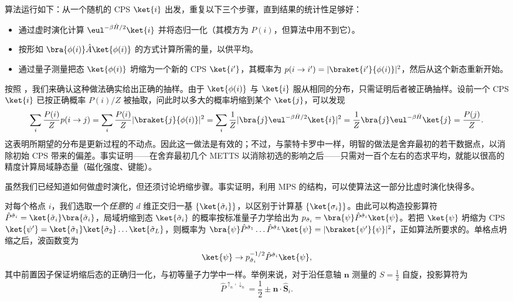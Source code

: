 算法运行如下：从一个随机的 CPS $\ket{i}$ 出发，重复以下三个步骤，直到结果的统计性足够好：
\begin{itemize}  
\item 通过虚时演化计算 $\eul^{-\beta\hat{H}/2} \ket{i}$ 并将态归一化（其模方为 $P(i)$，但算法中用不到它）。
\item 按形如 $\bra{\phi(i)} \hat{A} \ket{\phi(i)}$ 的方式计算所需的量，以供平均。
\item 通过量子测量把态 $\ket{\phi(i)}$ 坍缩为一个新的 CPS $\ket{i'}$，其概率为 $p(i\rightarrow i') = |\braket{i'}{\phi(i)}|^2$，然后从这个新态重新开始。
\end{itemize}

按照 \cite{Stoudenmire10}，我们来确认这种做法确实给出正确的抽样。由于 $\ket{\phi(i)}$ 与 $\ket{i}$ 服从相同的分布，只需证明后者被正确抽样。设前一个 CPS $\ket{i}$ 已按正确概率 $P(i)/Z$ 被抽取，问此时以多大的概率坍缩到某个 $\ket{j}$，可以发现
\begin{equation}
\sum_i \frac{P(i)}{Z} p(i\rightarrow j) = \sum_i \frac{P(i)}{Z} | \braket{j}{\phi(i)} |^2 = \sum_i
\frac{1}{Z} | \bra{j} \eul^{-\beta \hat{H}/2} \ket{i}|^2 = \frac{1}{Z} \bra{j} \eul^{-\beta\hat{H}} \ket{j} = \frac{P(j)}{Z}.
\end{equation}
这表明所期望的分布是更新过程的不动点。因此这一做法是有效的；不过，与蒙特卡罗中一样，明智的做法是舍弃最初的若干数据点，以消除初始 CPS 带来的偏差。事实证明——在舍弃最初几个 METTS 以消除初选的影响之后——只需对一百个左右的态求平均，就能以很高的精度计算局域静态量（磁化强度、键能）。

虽然我们已经知道如何做虚时演化，但还须讨论坍缩步骤。事实证明，利用 MPS 的结构，可以使算法这一部分比虚时演化快得多。

对每个格点 $i$，我们选取一个{\em 任意}的 $d$ 维正交归一基 $\{ \ket{\tilde{\sigma}_i} \}$，以区别于计算基 $\{ \ket{\sigma_i} \}$。由此可以构造投影算符 $\hat{P}^{\tilde{\sigma}_i} = \ket{\tilde{\sigma}_i} \bra{\tilde{\sigma}_i}$，局域坍缩到态 $\ket{\tilde{\sigma}_i}$ 的概率按标准量子力学给出为
$p_{\tilde{\sigma}_i} =\bra{\psi} \hat{P}^{\tilde{\sigma}_i} \ket{\psi}$。若把 $\ket{\psi}$ 坍缩为 CPS
$\ket{\psi'} = \ket{ \tilde{\sigma}_1} \ket{ \tilde{\sigma}_2} \ldots \ket{ \tilde{\sigma}_L}$，则概率为  $\bra{\psi} \hat{P}^{\tilde{\sigma}_1} \ldots \hat{P}^{\tilde{\sigma}_L} \ket{\psi} = | \braket{\psi'}{\psi} |^2$，正如算法所要求的。单格点坍缩之后，波函数变为
\begin{equation}
\ket{\psi} \rightarrow  p_{\tilde{\sigma}_i}^{-1/2} \hat{P}^{\tilde{\sigma}_i}\ket{\psi} ,
\end{equation}
其中前置因子保证坍缩后态的正确归一化，与初等量子力学中一样。举例来说，对于沿任意轴 ${\mathbf n}$ 测量的 $S=\frac{1}{2}$ 自旋，投影算符为
\begin{equation}
\hat{P}^{\uparrow_n,\downarrow_n} = \frac{1}{2} \pm {\mathbf n} \cdot \hat{{\mathbf S}}_i .
\end{equation}

